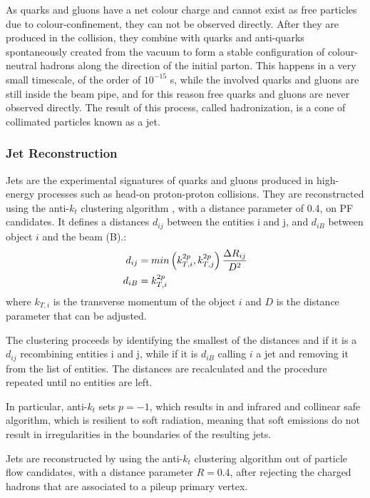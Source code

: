 As quarks and gluons have a net colour charge and cannot exist as free particles due to colour-confinement, they can not be observed directly.
After they are produced in the collision, they combine with quarks and anti-quarks spontaneously created from the vacuum
to form a stable configuration of colour-neutral hadrons along the direction of the initial parton.
This happens in a very small timescale, of the order of $10^{-15}$ s, while the involved quarks and gluons are still inside the beam pipe,
and for this reason free quarks and gluons are never observed directly.
The result of this process, called hadronization, is a cone of collimated particles known as a jet.

\subsubsection{Jet Reconstruction}

Jets are the experimental signatures of quarks and gluons produced in high-energy processes such as head-on proton-proton collisions.
They are reconstructed using the anti-$k_t$ clustering algorithm \cite{Cacciari:2008gp}, with a distance parameter of 0.4, on PF candidates.
It defines a distances $d_{ij}$ between the entities i and j, and $d_{iB}$ between object $i$ and the beam (B).:
\begin{equation}
\begin{split}
d_{ij} &= min \left( k^{2p}_{T,i}, k^{2p}_{T,j} \right) \frac{\Delta R_{ij}}{D^2}\\
d_{iB} &= k^{2p}_{T,i}
\end{split}
\end{equation}
where $k_{T, i}$ is the transverse momentum of the object $i$ and $D$ is the distance parameter that can be adjusted.

The clustering proceeds by identifying the smallest of the distances and if it is a $d_{ij}$ recombining entities i and j,
while if it is $d_{iB}$ calling $i$ a jet and removing it from the list of entities.
The distances are recalculated and the procedure repeated until no entities are left.

In particular, anti-$k_t$ sets $p = -1$, which results in and infrared and collinear safe algorithm, which is resilient to soft radiation,
meaning that soft emissions do not result in irregularities in the boundaries of the resulting jets.

Jets are reconstructed by using the anti-$k_t$ clustering algorithm out of particle flow candidates, with a distance parameter $R = 0.4$,
after rejecting the charged hadrons that are associated to a pileup primary vertex.


